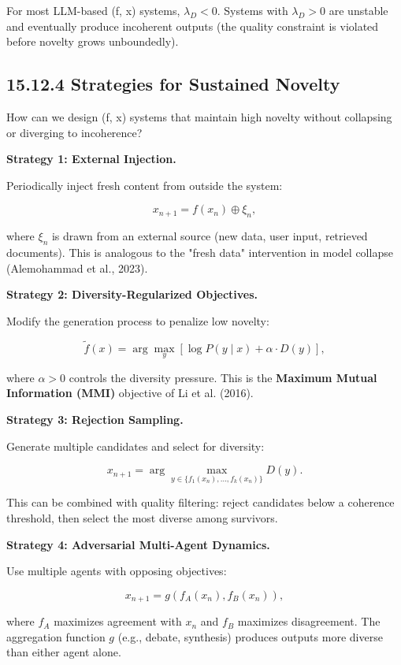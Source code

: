 \begin{conjecture}
For most LLM-based (f, x) systems, $\lambda_D < 0$. Systems with $\lambda_D > 0$ are unstable and eventually produce incoherent outputs (the quality constraint is violated before novelty grows unboundedly).
\end{conjecture}

\subsection{15.12.4 Strategies for Sustained Novelty}

How can we design (f, x) systems that maintain high novelty without collapsing or diverging to incoherence?

\textbf{Strategy 1: External Injection.}

Periodically inject fresh content from outside the system:

\[x_{n+1} = f(x_n) \oplus \xi_n,\]

where $\xi_n$ is drawn from an external source (new data, user input, retrieved documents). This is analogous to the "fresh data" intervention in model collapse (Alemohammad et al., 2023).

\textbf{Strategy 2: Diversity-Regularized Objectives.}

Modify the generation process to penalize low novelty:

\[\tilde{f}(x) = \arg\max_{y} \left[ \log P(y \mid x) + \alpha \cdot D(y) \right],\]

where $\alpha > 0$ controls the diversity pressure. This is the \textbf{Maximum Mutual Information (MMI)} objective of Li et al. (2016).

\textbf{Strategy 3: Rejection Sampling.}

Generate multiple candidates and select for diversity:

\[x_{n+1} = \arg\max_{y \in \{f_1(x_n), \ldots, f_k(x_n)\}} D(y).\]

This can be combined with quality filtering: reject candidates below a coherence threshold, then select the most diverse among survivors.

\textbf{Strategy 4: Adversarial Multi-Agent Dynamics.}

Use multiple agents with opposing objectives:

\[x_{n+1} = g(f_A(x_n), f_B(x_n)),\]

where $f_A$ maximizes agreement with $x_n$ and $f_B$ maximizes disagreement. The aggregation function $g$ (e.g., debate, synthesis) produces outputs more diverse than either agent alone.

